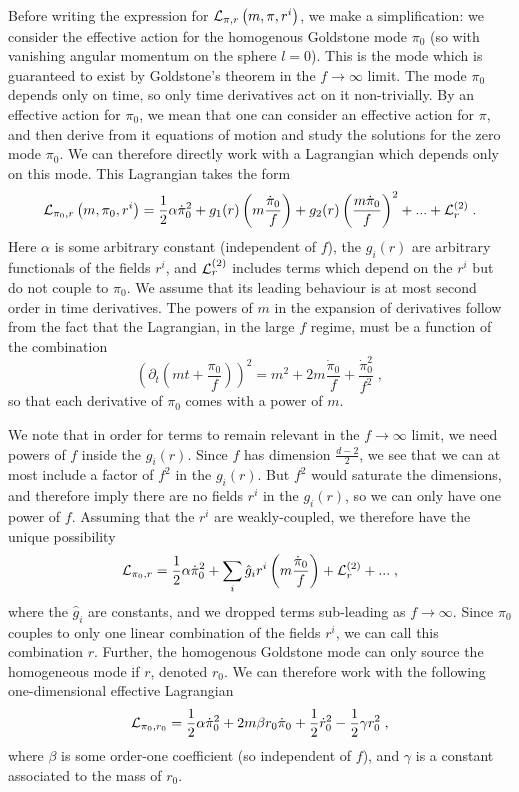 \documentclass[11pt]{article}
\numberwithin{equation}{section}
\newcommand{\be}{\begin{equation}} \newcommand{\ee}{\end{equation}}
\begin{document}
Before writing the expression for ${\cal L}_{\pi,r}\left(m,\pi,r^i\right)$, we make a simplification: we consider the effective action for the homogenous Goldstone mode $\pi_0$ (so with vanishing angular momentum on the sphere $l=0$). This is the mode which is guaranteed to exist by Goldstone's theorem in the $f \rightarrow \infty$ limit. The mode $\pi_0$ depends only on time, so only time derivatives act on it non-trivially. By an effective action for $\pi_0$, we mean that one can consider an effective action for $\pi$, and then derive from it equations of motion and study the solutions for the zero mode $\pi_0$. We can therefore directly work with a Lagrangian which depends only on this mode. 
This Lagrangian takes the form
\be
{\cal L}_{\pi_0,r}\left(m,\pi_0,r^i\right) = \frac12 \alpha\dot{\pi}_0^2 + g_1(r) \left( m\frac{\dot{\pi}_0}{f} \right) + g_2(r) \left( \frac{m\dot{\pi}_0 }{f}\right)^2  + ... + {\cal L}^{(2)}_r \;.
\label{getnga}
\ee
Here $\alpha$ is some arbitrary constant (independent of $f$), the $g_i(r)$ are arbitrary functionals of the fields $r^i$, and ${\cal L}_r^{(2)}$ includes terms which depend on the $r^i$ but do not couple to $\pi_0$. We assume that its leading behaviour is at most second order in time derivatives. The powers of $m$ in the expansion of derivatives follow from the fact that the Lagrangian, in the large $f$ regime, must be a function of the combination 
\be
\left(\partial_{t} \left( m t + \frac{\pi_0}{f} \right)\right)^2 = m^2 + 2 m\frac{\dot{\pi}_0}{f} + \frac{\dot{\pi}^2_0}{f^2}\;,
\label{mfcomb}
\ee
so that each derivative of $\pi_0$ comes with a power of $m$.

We note that in order for terms to remain relevant in the $f \rightarrow \infty$ limit, we need powers of $f$ inside the $g_i(r)$. Since $f$ has dimension $\frac{d-2}{2}$, we see that we can at most include a factor of $f^2$ in the $g_i(r)$. But $f^2$ would saturate the dimensions, and therefore imply there are no fields $r^i$ in the $g_i(r)$, so we can only have one power of $f$. Assuming that the $r^i$ are weakly-coupled, we therefore have the unique possibility
\be
{\cal L}_{\pi_0,r} = \frac12\alpha\dot{\pi}_0^2 + \sum_i \hat{g}_i r^i \left(  m\frac{\dot{\pi}_0}{f} \right) + {\cal L}^{(2)}_r + ...\;,
\ee
where the $\hat{g}_i$ are constants, and we dropped terms sub-leading as $f \rightarrow \infty$. Since $\pi_0$ couples to only one linear combination of the fields $r^i$, we can call this combination $r$. Further, the homogenous Goldstone mode can only source the homogeneous mode if $r$, denoted $r_0$. We can therefore work with the following one-dimensional effective Lagrangian
\be
{\cal L}_{\pi_0,r_0} = \frac12\alpha \dot{\pi}_0^2 + 2 m \beta r_0 \dot{\pi}_0 + \frac12 \dot{r}_0^2 - \frac12\gamma r_0^2 \;,
\label{Lepir0}
\ee
where $\beta$ is some order-one coefficient (so independent of $f$), and $\gamma$ is a constant associated to the mass of $r_0$. 
\end{document}
